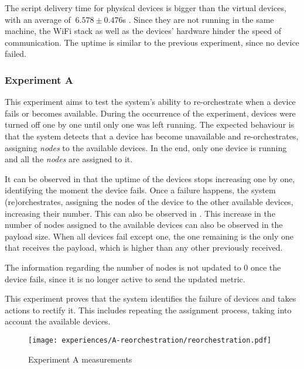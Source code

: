 The script delivery time for physical devices is bigger than the virtual devices, with an average of $~6.578\pm0.476$s . Since they are not running in the same machine, the WiFi stack as well as the devices' hardware hinder the speed of communication. The uptime is similar to the previous experiment, since no device failed.


\subsubsection{Experiment A}\label{sec:exp_a}

This experiment aims to test the system's ability to re-orchestrate when a device fails or becomes available. During the occurrence of the experiment, devices were turned off one by one until only one was left running. The expected behaviour is that the system detects that a device has become unavailable and re-orchestrates, assigning \textit{nodes} to the available devices. In the end, only one device is running and all the \textit{nodes} are assigned to it.

It can be observed in  that the uptime of the devices stops increasing one by one, identifying the moment the device fails. Once a failure happens, the system (re)orchestrates, assigning the nodes of the device to the other available devices, increasing their number. This can also be observed in . This increase in the number of nodes assigned to the available devices can also be observed in the payload size. When all devices fail except one, the one remaining is the only one that receives the payload, which is higher than any other previously received.

The information regarding the number of nodes is not updated to 0 once the device fails, since it is no longer active to send the updated metric. 

This experiment proves that the system identifies the failure of devices and takes actions to rectify it. This includes repeating the assignment process, taking into account the available devices.

\begin{figure}[h]
\centering
\texttt{[image: experiences/A-reorchestration/reorchestration.pdf]}
\caption[Experiment A measurements]{Experiment A measurements}\label{fig:experiment_a_graph}
\end{figure}

